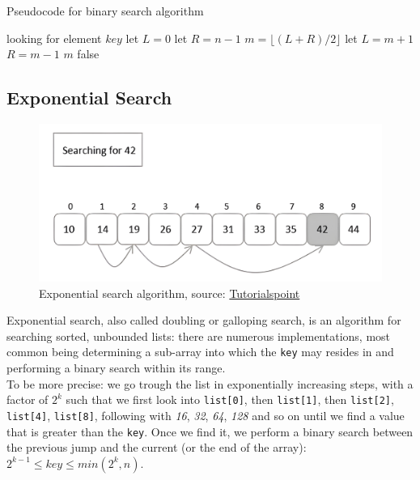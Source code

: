 \begin{algorithm}
    \captionsetup{labelsep=newline}
    \caption{Pseudocode for binary search algorithm \label{alg:binsearch}}
    \begin{algorithmic}[1]
        \State looking for element $key$
        \State let $L=0$ 
        \State let $R=n-1$ 
            \State $m=\lfloor (L+R)/2 \rfloor$
                \State let $L=m+1$
                \State $R = m - 1$
            \Else
                \State \Return $m$ 
            \EndIf
        \EndWhile
        \State \Return false 
    \end{algorithmic}
\end{algorithm}

\subsection{Exponential Search \label{sec:expsearch}}

\begin{figure}[H] 
    \begin{center}
        \includegraphics[width=.8\textwidth]{imgs/exponential_search.png}
        \caption{Exponential search algorithm, source: \href{https://www.tutorialspoint.com/data_structures_algorithms/exponential_search.htm}{Tutorialspoint}\label{fig:expsearch}}
    \end{center}
\end{figure}

Exponential search, also called doubling or galloping search, is an algorithm for searching sorted, unbounded lists: there are numerous implementations, most common being determining a sub-array into which the \verb|key| may resides in and performing a binary search  within its range.\\
To be more precise: we go trough the list in exponentially increasing steps, with a factor of $2^k$ such that we first look into \verb+list[0]+, then \verb+list[1]+, then \verb+list[2]+, \verb+list[4]+, \verb+list[8]+, following with \textit{16}, \textit{32}, \textit{64}, \textit{128} and so on until we find a value that is greater than the \verb|key|. Once we find it, we perform a binary search between the previous jump and the current (or the end of the array): $2^{k-1} \leq key \leq min(2^{k},n)$.

